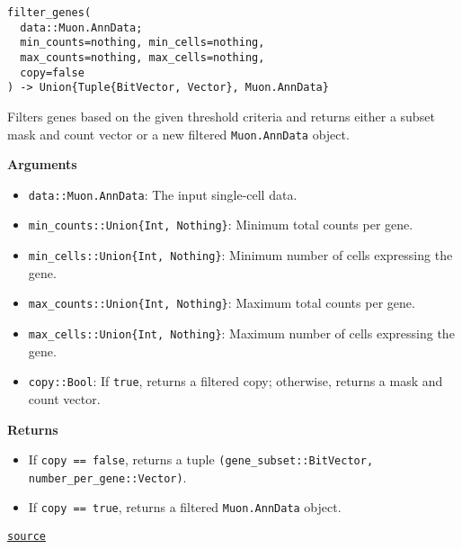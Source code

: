 \documentclass[oneside]{memoir}
\begin{document}
\begin{adjustwidth}{2em}{0pt}


\begin{verbatim}
filter_genes(
  data::Muon.AnnData;
  min_counts=nothing, min_cells=nothing,
  max_counts=nothing, max_cells=nothing,
  copy=false
) -> Union{Tuple{BitVector, Vector}, Muon.AnnData}
\end{verbatim}

Filters genes based on the given threshold criteria and returns either a subset mask and count vector or a new filtered \texttt{Muon.AnnData} object.

\textbf{Arguments}

\begin{itemize}
\item \texttt{data::Muon.AnnData}: The input single-cell data.


\item \texttt{min\_counts::Union\{Int, Nothing\}}: Minimum total counts per gene.


\item \texttt{min\_cells::Union\{Int, Nothing\}}: Minimum number of cells expressing the gene.


\item \texttt{max\_counts::Union\{Int, Nothing\}}: Maximum total counts per gene.


\item \texttt{max\_cells::Union\{Int, Nothing\}}: Maximum number of cells expressing the gene.


\item \texttt{copy::Bool}: If \texttt{true}, returns a filtered copy; otherwise, returns a mask and count vector.

\end{itemize}
\textbf{Returns}

\begin{itemize}
\item If \texttt{copy == false}, returns a tuple \texttt{(gene\_subset::BitVector, number\_per\_gene::Vector)}.


\item If \texttt{copy == true}, returns a filtered \texttt{Muon.AnnData} object.

\end{itemize}


\href{https://github.com/zehua0417/Juscan.jl/blob/393ad1b827b678ea98a738f92af658ee9ed9a403/src/preprocessing/filter.jl#L201-L222}{\texttt{source}}




\end{adjustwidth}
\end{document}
